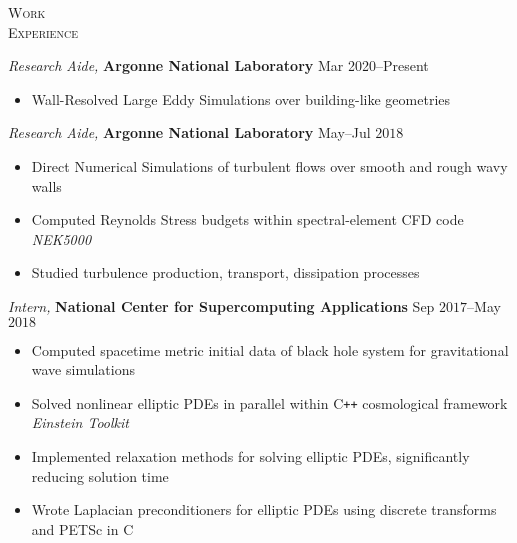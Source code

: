 \documentclass[10pt]{article}
\begin{document}
\begin{multicols}{2}
\textsc{Work \\ Experience}
\columnbreak

{\sl Research Aide,} \textbf{Argonne National Laboratory} \hfill Mar 2020--Present

\vspace{-1.75em}
\begin{itemize}[label=-]
    \setlength\itemsep{-0.25em}
    \item Wall-Resolved Large Eddy Simulations over building-like geometries
\end{itemize}
\vspace{-2.0em}

\vspace{0.5em}
%
{\sl Research Aide,} \textbf{Argonne National Laboratory} \hfill May--Jul $2018$

\vspace{-1.75em}
\begin{itemize}[label=-]
    \setlength\itemsep{-0.25em}
    \item Direct Numerical Simulations of turbulent flows over smooth and rough wavy walls
    \item Computed Reynolds Stress budgets within spectral-element CFD code \textit{NEK5000}
    \item Studied turbulence production, transport, dissipation processes%
\end{itemize}
\vspace{-2.0em}

\vspace{0.5em}
%
{\sl Intern,} \textbf{National Center for Supercomputing Applications} \hfill Sep $2017$--May $2018$

\vspace{-1.75em}
\begin{itemize}[label=-]
    \setlength\itemsep{-0.25em}
    \item Computed spacetime metric initial data of black hole system for gravitational wave simulations
    \item Solved nonlinear elliptic PDEs in parallel within C\texttt{++} cosmological framework \textit{Einstein Toolkit}
    \item Implemented relaxation methods for solving elliptic PDEs, significantly reducing solution time
    \item Wrote Laplacian preconditioners for elliptic PDEs using discrete transforms and PETSc in C
\end{itemize}
\vspace{-2.0em}


\end{multicols}
\end{document}
